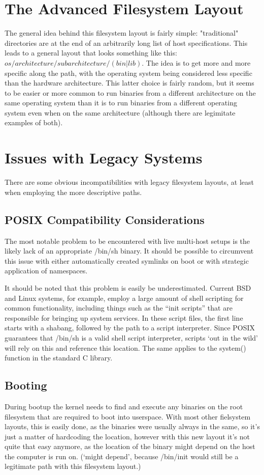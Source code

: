 \documentclass[a4paper,twoside,titlepage]{article}
\begin{document}
\newpage

\section{The Advanced Filesystem Layout}
The general idea behind this filesystem layout is fairly simple: "traditional"
directories are at the end of an arbitrarily long list of host specifications.
This leads to a general layout that looks something like this:
$os/architecture/subarchitecture/(bin|lib)$. The idea is to get more and more
specific along the path, with the operating system being considered less
specific than the hardware architecture. This latter choice is fairly random,
but it seems to be easier or more common to run binaries from a different
architecture on the same operating system than it is to run binaries from a
different operating system even when on the same architecture (although there
are legimitate examples of both).

\newpage

\section{Issues with Legacy Systems}
There are some obvious incompatibilities with legacy filesystem layouts, at
least when employing the more descriptive paths.

\subsection{POSIX Compatibility Considerations}
The most notable problem to be encountered with live multi-host setups is the
likely lack of an appropriate /bin/sh binary. It should be possible to
circumvent this issue with either automatically created symlinks on boot or
with strategic application of namespaces.

It should be noted that this problem is easily be underestimated. Current BSD
and Linux systems, for example, employ a large amount of shell scripting for
common functionality, including things such as the ``init scripts'' that are
responsible for bringing up system services. In these script files, the first
line starts with a shabang, followed by the path to a script interpreter. Since
POSIX guarantees that /bin/sh is a valid shell script interpreter, scripts `out
in the wild' will rely on this and reference this location. The same applies to
the system() function in the standard C library.

\subsection{Booting}
During bootup the kernel needs to find and execute any binaries on the root
filesystem that are required to boot into userspace. With most other fielsystem
layouts, this is easily done, as the binaries were usually always in the same,
so it's just a matter of hardcoding the location, however with this new layout
it's not quite that easy anymore, as the location of the binary might depend on
the host the computer is run on. (`might depend', because /bin/init would still
be a legitimate path with this filesystem layout.)
\end{document}
